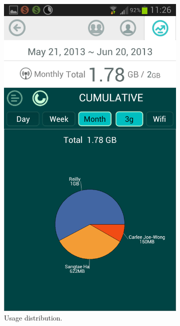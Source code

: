 \begin{figure}
\begin{subfigure}[b]{0.23\textwidth}
	\includegraphics[width = \textwidth]{Figures/Pie_Chart.png}
	\caption{Usage distribution.}
	\label{fig:datawiz_pie}
	\end{subfigure}
	\begin{subfigure}[b]{0.23\textwidth}

\end{subfigure}
\end{figure}
